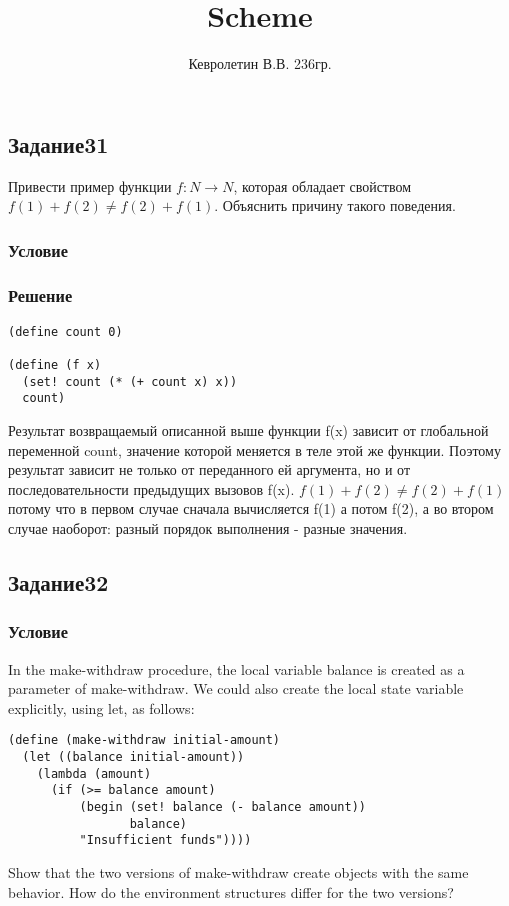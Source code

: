 \documentclass[10pt,a4paper]{article}
\author{Кевролетин В.В. 236гр.}
\title{Scheme}
\begin{document}
\maketitle

\subsection*{Задание31}
Привести пример функции $f:N\rightarrow N$, которая обладает свойством
$f(1)+f(2)\not =f(2)+f(1)$. Объяснить причину такого поведения.
\subsubsection*{Условие}
\subsubsection*{Решение}
\begin{lstlisting}
(define count 0)

(define (f x)
  (set! count (* (+ count x) x))
  count)
\end{lstlisting}

Результат возвращаемый описанной выше функции f(x) зависит от
глобальной переменной
count, значение которой меняется в теле этой же функции. Поэтому
результат  зависит не только от переданного ей аргумента, но и
от
последовательности предыдущих вызовов f(x).
$f(1)+f(2)\not =f(2)+f(1)$
потому что в первом случае сначала вычисляется f(1) а потом f(2), а во
втором случае наоборот: разный порядок выполнения - разные значения.

\subsection*{Задание32}
\subsubsection*{Условие}
In the make-withdraw procedure, the local variable balance is created
as a parameter of make-withdraw. We could also create the local state
variable explicitly, using let, as follows:
\begin{lstlisting}
(define (make-withdraw initial-amount)
  (let ((balance initial-amount))
    (lambda (amount)
      (if (>= balance amount)
          (begin (set! balance (- balance amount))
                 balance)
          "Insufficient funds"))))
\end{lstlisting}
Show that the two versions of make-withdraw create objects with the
same behavior. How do the environment structures differ for the two
versions?
\end{document}
